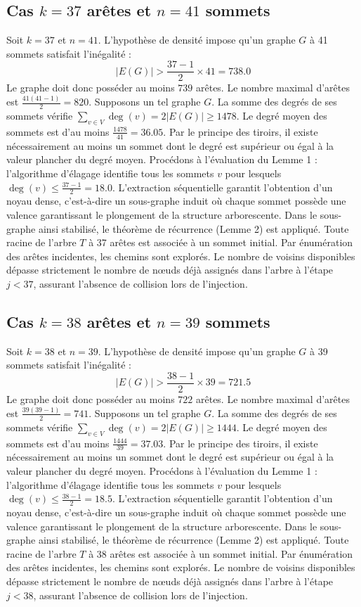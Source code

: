 \documentclass[12pt,a4paper]{article}
\begin{document}
\subsection{Cas $k = 37$ arêtes et $n = 41$ sommets}
Soit $k = 37$ et $n = 41$. L'hypothèse de densité impose qu'un graphe $G$ à 41 sommets satisfait l'inégalité :
$$ |E(G)| > \frac{37-1}{2} \times 41 = 738.0 $$
Le graphe doit donc posséder au moins $739$ arêtes. Le nombre maximal d'arêtes est $\frac{41(41-1)}{2} = 820$.
Supposons un tel graphe $G$. La somme des degrés de ses sommets vérifie $\sum_{v \in V} \deg(v) = 2|E(G)| \geq 1478$.
Le degré moyen des sommets est d'au moins $\frac{1478}{41} = 36.05$.
Par le principe des tiroirs, il existe nécessairement au moins un sommet dont le degré est supérieur ou égal à la valeur plancher du degré moyen.
Procédons à l'évaluation du Lemme 1 : l'algorithme d'élagage identifie tous les sommets $v$ pour lesquels $\deg(v) \leq \frac{37-1}{2} = 18.0$.
L'extraction séquentielle garantit l'obtention d'un noyau dense, c'est-à-dire un sous-graphe induit où chaque sommet possède une valence garantissant le plongement de la structure arborescente.
Dans le sous-graphe ainsi stabilisé, le théorème de récurrence (Lemme 2) est appliqué. Toute racine de l'arbre $T$ à 37 arêtes est associée à un sommet initial. Par énumération des arêtes incidentes, les chemins sont explorés. Le nombre de voisins disponibles dépasse strictement le nombre de nœuds déjà assignés dans l'arbre à l'étape $j < 37$, assurant l'absence de collision lors de l'injection.

\subsection{Cas $k = 38$ arêtes et $n = 39$ sommets}
Soit $k = 38$ et $n = 39$. L'hypothèse de densité impose qu'un graphe $G$ à 39 sommets satisfait l'inégalité :
$$ |E(G)| > \frac{38-1}{2} \times 39 = 721.5 $$
Le graphe doit donc posséder au moins $722$ arêtes. Le nombre maximal d'arêtes est $\frac{39(39-1)}{2} = 741$.
Supposons un tel graphe $G$. La somme des degrés de ses sommets vérifie $\sum_{v \in V} \deg(v) = 2|E(G)| \geq 1444$.
Le degré moyen des sommets est d'au moins $\frac{1444}{39} = 37.03$.
Par le principe des tiroirs, il existe nécessairement au moins un sommet dont le degré est supérieur ou égal à la valeur plancher du degré moyen.
Procédons à l'évaluation du Lemme 1 : l'algorithme d'élagage identifie tous les sommets $v$ pour lesquels $\deg(v) \leq \frac{38-1}{2} = 18.5$.
L'extraction séquentielle garantit l'obtention d'un noyau dense, c'est-à-dire un sous-graphe induit où chaque sommet possède une valence garantissant le plongement de la structure arborescente.
Dans le sous-graphe ainsi stabilisé, le théorème de récurrence (Lemme 2) est appliqué. Toute racine de l'arbre $T$ à 38 arêtes est associée à un sommet initial. Par énumération des arêtes incidentes, les chemins sont explorés. Le nombre de voisins disponibles dépasse strictement le nombre de nœuds déjà assignés dans l'arbre à l'étape $j < 38$, assurant l'absence de collision lors de l'injection.
\end{document}
